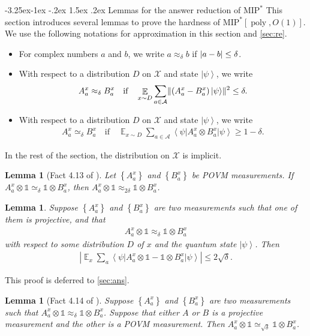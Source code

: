 \documentclass[10pt,a4paper]{article}
\makeatletter
\renewcommand{\subsection}{\@startsection{subsection}{2}{\z@}%
             {-3.25ex\@plus -1ex \@minus -.2ex}%
             {1.5ex \@plus .2ex}%
             {\normalfont\large\scshape\bfseries}}
\theoremstyle{plain}
\newtheorem{lemma}[theorem]{Lemma}
\theoremstyle{definition}
\newcommand {\set} [1] {\ensuremath{ \left\lbrace #1 \right\rbrace }}
\DeclarePairedDelimiter{\norm}{\lVert}{\rVert}
\newcommand {\ab} [1] {\ensuremath{ \left| #1 \right| }}
\DeclarePairedDelimiter{\abs}{\lvert}{\rvert}
\newcommand {\bra} [1] {\ensuremath{ \left\langle #1 \right| }}
\newcommand {\ket} [1] {\ensuremath{ \left| #1 \right\rangle }}
\DeclareMathOperator*{\bigE}{\mathbb{E}}
\newcommand {\id} {\ensuremath{\mathds{1}}}
\newcommand{\poly} {\ensuremath{\operatorname{poly}}}
\newcommand{\x}{\otimes}
\newcommand{\calX}{\mathcal{X}}
\newcommand{\calA}{\mathcal{A}}
\newcommand{\appd}[1]{\approx_{#1}}
\newcommand{\1}{\mathbb{1}} %
\newcommand{\MIP}{\mathrm{MIP}}
\makeatother
\begin{document}
\subsection{Lemmas for the answer reduction of \texorpdfstring{$\MIP^\ast$}{MIP*}}
\label{sec:lemma_mip}
This section introduces several lemmas to prove the hardness of $\MIP^\ast[\poly,O(1)]$. 
We use the following notations for approximation in this section and \cref{sec:re}.
\begin{itemize}
\item For complex numbers $a$ and $b$, we write $a \appd{\delta} b$ if $\abs{a - b} \leq \delta$.
\item With respect to a distribution $D$ on $\calX$ and state $\ket{\psi}$, we write
\begin{align*}
	A^x_a \appd{\delta} B^x_a \quad \text{if} \quad \bigE_{x \sim D}\sum_{a \in \calA} \norm{ (A^x_a - B^x_a) \ket{\psi}}^2 \leq \delta.
\end{align*}
	\item With respect to a distribution $D$ on $\calX$ and state $\ket{\psi}$, we write
	\begin{align*}
		A^x_a \simeq_{\delta} B^x_a \quad \text{if} \quad \bigE_{x \sim D} \sum_{a \in \calA} \bra{\psi} A^x_a \x B^x_a \ket{\psi} \geq 1 - \delta.
	\end{align*}
\end{itemize}
In the rest of the section, the distribution on $\calX$ is implicit.
\begin{lemma}[Fact 4.13 of \cite{neexp}]
	\label{lm:consist_to_approx}
	Let $\set{A^x_a}$ and $\set{B^x_a}$ be POVM measurements.
	If $A^x_a \x \id \simeq_{\delta} \id \x B^x_a$, then $A^x_a \x \id \appd{2\delta} \id \x B^x_a$.
\end{lemma}
\begin{lemma} 
	\label{lm:close}
	Suppose $\set{A^x_a}$ and $\set{ B^x_a }$ are two measurements such that
	one of them is projective, and that 
	\begin{align*}
		A^x_a \x \id \appd{\delta} \id \x B^x_a
	\end{align*}
	with respect to some distribution $D$ of $x$ and the quantum state $\ket{\psi}$.
	Then
	\begin{align*}
		\ab{ \bigE_x \sum_a \bra{\psi} A^x_a \x \id - \id\x B^x_a \ket{\psi}} \leq  2 \sqrt{\delta}.
	\end{align*}
\end{lemma}
This proof is deferred to \cref{sec:ans}.
\begin{lemma}[Fact 4.14 of \cite{neexp}]
	\label{lm:convert}
	Suppose $\set{A^x_a}$ and $\set{ B^x_a }$ are two measurements such that 
	$A^x_a \x \id \appd{\delta} \id \x B^x_a$.
	Suppose that either $A$ or $B$ is a projective measurement and the other is a POVM measurement.
	Then $A^x_a \x \id \simeq_{\sqrt{\delta}} \id \x B^x_a$.
\end{lemma}
\end{document}

